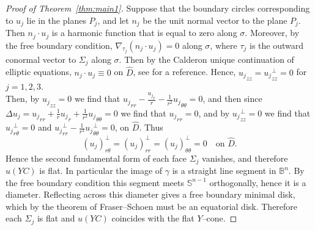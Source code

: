 \documentclass[11pt]{amsart}
\numberwithin{equation}{section}
\theoremstyle{theorem}
\theoremstyle{definition}
\numberwithin{equation}{section}
\begin{document}
\begin{proof}[Proof of Theorem~\ref{thm:main1}]
Suppose that the boundary circles corresponding to $u_j$ lie in the planes $P_j$, and let $n_j$ be the unit normal vector to the plane $P_j$. Then $n_j\cdot u_j$ is a harmonic function that is equal to zero along $\sigma$. Moreover, by the free boundary condition, $\nabla_{\tau_j}(n_j\cdot u_j)=0$ along $\sigma$, where $\tau_j$ is the outward conormal vector to $\Sigma_j$ along $\sigma$. Then by the Calderon unique continuation of elliptic equations, $n_j\cdot u_j\equiv 0$ on $\hat{D}$, see \cite{gilbarg1977elliptic} for a reference. Hence, ${u_j}_{zz}={u_j}_{zz}^{\perp}=0$ for $j=1,2,3$.\\ 
Then, by ${u_j}_{zz}=0$ we find that ${u_j}_{rr}-\frac{{u_j}_r}{r}-\frac{1}{r^2}{u_j}_{\theta \theta}=0$, and then since $\Delta u_j ={u_j}_{rr}+\frac{1}{r}{u_j}_r+\frac{1}{r^2}{u_j}_{\theta \theta}=0$ we find that ${u_j}_{rr}=0$, and by ${u_j}_{zz}^{\perp}=0$ we find that ${u_j}_{r\theta}^{\perp}=0$ and ${u_j}_{rr}^{\perp}-\frac{1}{r^2}{u_j}_{\theta \theta}^{\perp}=0$, on $\hat{D}$. Thus
\[
(u_j)_{r\theta}^{\perp}
=
(u_j)_{rr}^{\perp}
=
(u_j)_{\theta\theta}^{\perp}
=0
\quad\text{on }\hat D .
\]
Hence the second fundamental form of each face $\Sigma_j$ vanishes, and therefore $u(YC)$ is flat. 
In particular the image of $\gamma$ is a straight line segment in $\mathbb{B}^n$. 
By the free boundary condition this segment meets $\mathbb{S}^{n-1}$ orthogonally, hence it is a diameter. 
Reflecting across this diameter gives a free boundary minimal disk, which by the theorem of Fraser–Schoen \cite{fraser2015uniqueness} must be an equatorial disk. 
Therefore each $\Sigma_j$ is flat and $u(YC)$ coincides with the flat $Y$–cone.  
\end{proof}
\end{document}

